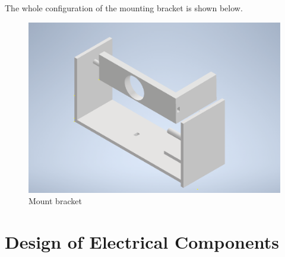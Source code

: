 \documentclass[12pt, titlepage]{article}
\begin{document}
The whole configuration of the mounting bracket is shown below.
\begin{figure}[H]
\caption{Mount bracket}
\centering
\includegraphics[width=\textwidth]{whole_part.png}
\end{figure}


\section{Design of Electrical Components}
\end{document}
